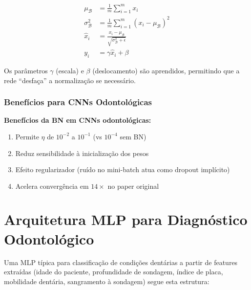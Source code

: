 \begin{align}
  \mu_{\mathcal{B}} &= \frac{1}{m} \sum_{i=1}^{m} x_i \label{eq:bn-mean} \\
  \sigma_{\mathcal{B}}^2 &= \frac{1}{m} \sum_{i=1}^{m} (x_i - \mu_{\mathcal{B}})^2 \label{eq:bn-var} \\
  \hat{x}_i &= \frac{x_i - \mu_{\mathcal{B}}}{\sqrt{\sigma_{\mathcal{B}}^2 + \epsilon}} \label{eq:bn-norm} \\
  y_i &= \gamma \hat{x}_i + \beta \label{eq:bn-scale}
\end{align}

Os parâmetros $\gamma$ (escala) e $\beta$ (deslocamento) são aprendidos,
permitindo que a rede ``desfaça'' a normalização se necessário.

\subsubsection{Benefícios para CNNs Odontológicas}

\textbf{Benefícios da BN em CNNs odontológicas:}
\begin{enumerate}
  \item Permite $\eta$ de $10^{-2}$ a $10^{-1}$ (vs $10^{-4}$ sem BN)
  \item Reduz sensibilidade à inicialização dos pesos
  \item Efeito regularizador (ruído no mini-batch atua como dropout implícito)
  \item Acelera convergência em $14\times$ no paper original
\end{enumerate}


\section{Arquitetura MLP para Diagnóstico Odontológico}
\label{sec:mlp-odonto}

Uma MLP típica para classificação de condições dentárias a partir de features
extraídas (idade do paciente, profundidade de sondagem, índice de placa,
mobilidade dentária, sangramento à sondagem) segue esta estrutura:

